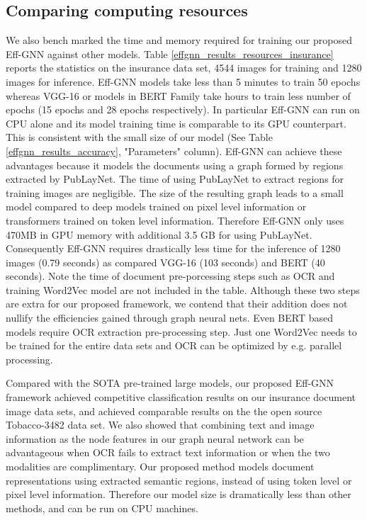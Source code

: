\documentclass[letterpaper]{article}
\begin{document}
\subsection{Comparing computing resources}
We also bench marked the time and memory required for training our proposed Eff-GNN against other models. Table \ref{effgnn_results_resources_insurance} reports the statistics on the insurance data set, 4544 images for training and 1280 images for inference. Eff-GNN models take less than 5 minutes to train 50 epochs whereas VGG-16 or models in BERT Family take hours to train less number of epochs (15 epochs and 28 epochs respectively). In particular Eff-GNN can run on CPU alone and its model training time is comparable to its GPU counterpart. This is consistent with the small size of our model (See Table \ref{effgnn_results_accuracy},  "Parameters" column). Eff-GNN can achieve these advantages because it models the documents using a graph formed by regions extracted by PubLayNet. The time of using PubLayNet to extract regions for training images are negligible. The size of the resulting graph leads to a small model compared to deep models trained on pixel level information or transformers trained on token level information. Therefore Eff-GNN only uses 470MB in GPU memory with additional 3.5 GB for using PubLayNet. Consequently Eff-GNN requires drastically less time for the inference of 1280 images (0.79 seconds) as compared VGG-16 (103 seconds) and BERT (40 seconds). Note the time of document pre-porcessing steps such as OCR and training Word2Vec model are not included in the table. Although these two steps are extra for our proposed framework, we contend that their addition does not nullify the efficiencies gained through graph neural nets. Even BERT based models require OCR extraction pre-processing step. Just one Word2Vec needs to be trained for the entire data sets and OCR can be optimized by e.g. parallel processing.\par
Compared with the SOTA pre-trained large models, our proposed Eff-GNN framework achieved competitive classification results on our insurance document image data sets, and achieved comparable results on the the open source Tobacco-3482 data set. We also showed that combining text and image information as the node features in our graph neural network can be advantageous when OCR fails to extract text information or when the two modalities are complimentary. Our proposed method models document representations using extracted semantic regions, instead of using token level or pixel level information. Therefore our model size is dramatically less than other methods, and can be run on CPU machines.
\end{document}
